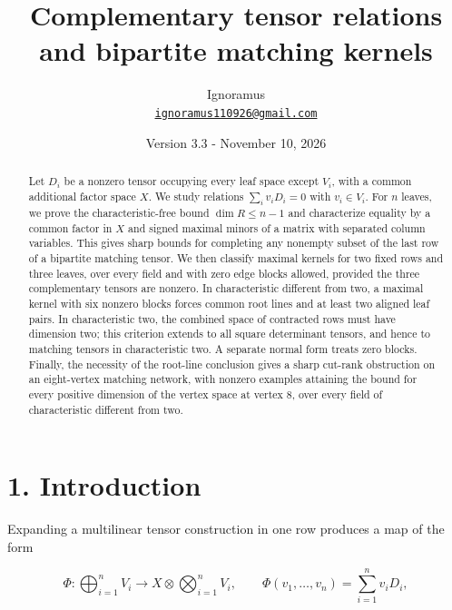 \documentclass[11pt]{article}
\begin{document}
\title{Complementary tensor relations and bipartite matching kernels}\author{Ignoramus\\[3pt]{\small\href{mailto:ignoramus110926@gmail.com}{\nolinkurl{ignoramus110926@gmail.com}}}}\date{Version 3.3 - November 10, 2026}\maketitle

\begin{abstract}

Let $D_i$ be a nonzero tensor occupying every leaf space except $V_i$, with a common additional factor space $X$. We study relations $\sum_i v_iD_i=0$ with $v_i\in V_i$. For $n$ leaves, we prove the characteristic-free bound $\dim R\leq n-1$ and characterize equality by a common factor in $X$ and signed maximal minors of a matrix with separated column variables. This gives sharp bounds for completing any nonempty subset of the last row of a bipartite matching tensor. We then classify maximal kernels for two fixed rows and three leaves, over every field and with zero edge blocks allowed, provided the three complementary tensors are nonzero. In characteristic different from two, a maximal kernel with six nonzero blocks forces common root lines and at least two aligned leaf pairs. In characteristic two, the combined space of contracted rows must have dimension two; this criterion extends to all square determinant tensors, and hence to matching tensors in characteristic two. A separate normal form treats zero blocks. Finally, the necessity of the root-line conclusion gives a sharp cut-rank obstruction on an eight-vertex matching network, with nonzero examples attaining the bound for every positive dimension of the vertex space at vertex 8, over every field of characteristic different from two.


\end{abstract}

\section*{1. Introduction}

Expanding a multilinear tensor construction in one row produces a map of the form


\nopagebreak[4]

\begin{equation}
\Phi:\bigoplus_{i=1}^n V_i\longrightarrow X\otimes\bigotimes_{i=1}^n V_i,
\qquad \Phi(v_1,\ldots,v_n)=\sum_{i=1}^n v_iD_i,
\tag{1}
\end{equation}
\end{document}
